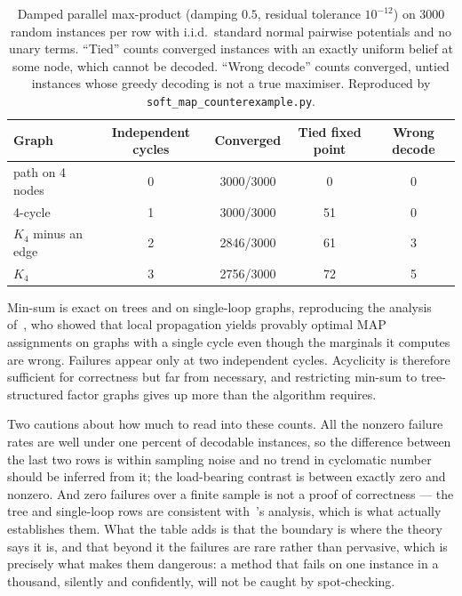 \begin{table}[h]
    \centering
    \begin{tabular}{lcccc}
        \toprule
        \textbf{Graph} & \textbf{Independent cycles} & \textbf{Converged} & \textbf{Tied fixed point} & \textbf{Wrong decode} \\
        \midrule
        path on 4 nodes         & 0 & 3000/3000 & 0  & 0 \\
        4-cycle                 & 1 & 3000/3000 & 51 & 0 \\
        $K_4$ minus an edge     & 2 & 2846/3000 & 61 & 3 \\
        $K_4$                   & 3 & 2756/3000 & 72 & 5 \\
        \bottomrule
    \end{tabular}
    \caption{Damped parallel max-product (damping $0.5$, residual tolerance $10^{-12}$) on 3000 random instances per row with i.i.d.\ standard normal pairwise potentials and no unary terms. ``Tied'' counts converged instances with an exactly uniform belief at some node, which cannot be decoded. ``Wrong decode'' counts converged, untied instances whose greedy decoding is not a true maximiser. Reproduced by \texttt{soft\_map\_counterexample.py}.}
    \label{tab:failure_rates}
\end{table}

Min-sum is exact on trees and on single-loop graphs, reproducing the analysis of~\citet{Weiss2000}, who showed that local propagation yields provably optimal MAP assignments on graphs with a single cycle even though the marginals it computes are wrong. Failures appear only at two independent cycles. Acyclicity is therefore sufficient for correctness but far from necessary, and restricting min-sum to tree-structured factor graphs gives up more than the algorithm requires.

Two cautions about how much to read into these counts. All the nonzero failure rates are well under one percent of decodable instances, so the difference between the last two rows is within sampling noise and no trend in cyclomatic number should be inferred from it; the load-bearing contrast is between exactly zero and nonzero. And zero failures over a finite sample is not a proof of correctness --- the tree and single-loop rows are consistent with~\citet{Weiss2000}'s analysis, which is what actually establishes them. What the table adds is that the boundary is where the theory says it is, and that beyond it the failures are rare rather than pervasive, which is precisely what makes them dangerous: a method that fails on one instance in a thousand, silently and confidently, will not be caught by spot-checking.

